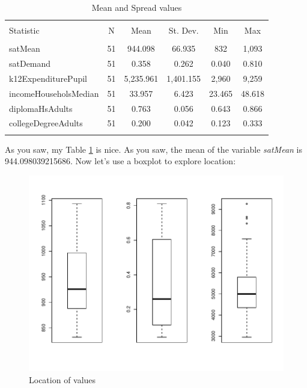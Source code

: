 \documentclass[11pt]{article}
\begin{document}
\begin{table}[!htbp] \centering 
  \caption{Mean and Spread values} 
  \label{measures} 
\begin{tabular}{@{\extracolsep{5pt}}lccccc} 
\\[-1.8ex]\hline 
\hline \\[-1.8ex] 
Statistic & \multicolumn{1}{c}{N} & \multicolumn{1}{c}{Mean} & \multicolumn{1}{c}{St. Dev.} & \multicolumn{1}{c}{Min} & \multicolumn{1}{c}{Max} \\ 
\hline \\[-1.8ex] 
satMean & 51 & 944.098 & 66.935 & 832 & 1,093 \\ 
satDemand & 51 & 0.358 & 0.262 & 0.040 & 0.810 \\ 
k12ExpenditurePupil & 51 & 5,235.961 & 1,401.155 & 2,960 & 9,259 \\ 
incomeHouseholsMedian & 51 & 33.957 & 6.423 & 23.465 & 48.618 \\ 
diplomaHsAdults & 51 & 0.763 & 0.056 & 0.643 & 0.866 \\ 
collegeDegreeAdults & 51 & 0.200 & 0.042 & 0.123 & 0.333 \\ 
\hline \\[-1.8ex] 
\end{tabular} 
\end{table} 
As you saw, my Table \ref{measures} is nice. As you saw, the mean of the variable \emph{satMean} is 944.098039215686. Now let's use a boxplot to explore location:



\begin{figure}[h]
\centering
\includegraphics{PaperInR_2-location}
\caption{Location of values}
\label{plot_boxplots}
\end{figure}
\end{document}
